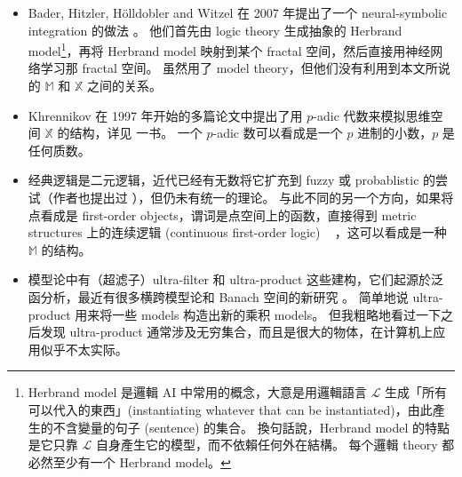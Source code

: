 \documentclass[orivec]{llncs}
\begin{document}
\begin{itemize}
\renewcommand\labelitemi{\textbullet}


\item Bader, Hitzler, H\"{o}lldobler and Witzel 在 2007 年提出了一个 neural-symbolic integration 的做法 \cite{Bader2007}。 他们首先由 logic theory 生成抽象的 Herbrand model\footnote{Herbrand model 是邏輯 AI 中常用的概念，大意是用邏輯語言 $\mathcal{L}$ 生成「所有可以代入的東西」(instantiating whatever that can be instantiated)，由此產生的不含變量的句子 (sentence) 的集合。 換句話說，Herbrand model 的特點是它只靠 $\mathcal{L}$ 自身產生它的模型，而不依賴任何外在結構。 每个邏輯 theory 都必然至少有一个 Herbrand model。}，再将 Herbrand model 映射到某个 fractal 空间，然后直接用神经网络学习那 fractal 空间。  虽然用了 model theory，但他们没有利用到本文所说的 $\mathbb{M}$ 和 $\mathbb{X}$ 之间的关系。 

\item Khrennikov 在 1997 年开始的多篇论文中提出了用 $p$-adic 代数来模拟思维空间 $\mathbb{X}$ 的结构，详见\cite{Anashin2009} 一书。 一个 $p$-adic 数可以看成是一个 $p$ 进制的小数，$p$ 是任何质数。

\item 经典逻辑是二元逻辑，近代已经有无数将它扩充到 fuzzy 或 probablistic 的尝试（作者也提出过 \cite{Yan2012}），但仍未有统一的理论。 与此不同的另一个方向，如果将点看成是 first-order objects，谓词是点空间上的函数，直接得到 metric structures 上的连续逻辑 (continuous first-order logic) ~ \cite{Yaacov2008}，这可以看成是一种 $\mathbb{M}$ 的结构。

\item 模型论中有（超滤子）ultra-filter 和 ultra-product 这些建构，它们起源於泛函分析，最近有很多横跨模型论和 Banach 空间的新研究 \cite{Iovino2002}。 简单地说 ultra-product 用来将一些 models 构造出新的乘积 models。 但我粗略地看过一下之后发现 ultra-product 通常涉及无穷集合，而且是很大的物体，在计算机上应用似乎不太实际。

\end{itemize}
\end{document}
